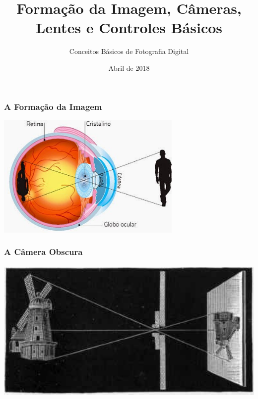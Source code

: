 


\subtitle{Conceitos Básicos de Fotografia Digital}
\title{Formação da Imagem, Câmeras, Lentes e Controles Básicos}
\author{}
\date{Abril de 2018}



\coverframe

\begin{frame}
    \frametitle{A Formação da Imagem}
\begin{center}
    \includegraphics[height=6cm]{images/olho.jpg}
\end{center}
\end{frame}

\begin{frame}
    \frametitle{A Câmera Obscura}
\begin{center}
    \includegraphics[height=7cm]{images/pinhole.jpg}
\end{center}
\end{frame}

